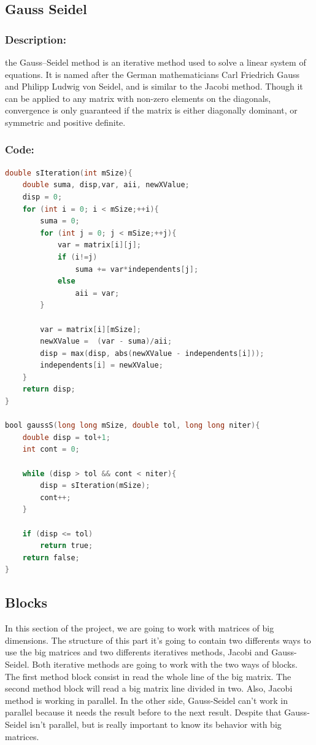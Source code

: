 \documentclass{article}
\begin{document}
\subsection{Gauss Seidel}

\subsubsection{Description:}
 the Gauss–Seidel method is an iterative method used to solve a linear system of equations. It is named after the German mathematicians Carl Friedrich Gauss and Philipp Ludwig von Seidel, and is similar to the Jacobi method. Though it can be applied to any matrix with non-zero elements on the diagonals, convergence is only guaranteed if the matrix is either diagonally dominant, or symmetric and positive definite.

\subsubsection{Code:}

\begin{lstlisting}[language=C]
  double sIteration(int mSize){
    double suma, disp,var, aii, newXValue;
    disp = 0;
    for (int i = 0; i < mSize;++i){
        suma = 0;
        for (int j = 0; j < mSize;++j){
            var = matrix[i][j];
            if (i!=j)
                suma += var*independents[j];
            else
                aii = var;
        }

        var = matrix[i][mSize];
        newXValue =  (var - suma)/aii;
        disp = max(disp, abs(newXValue - independents[i]));
        independents[i] = newXValue;
    }
    return disp;
}

bool gaussS(long long mSize, double tol, long long niter){
    double disp = tol+1;
    int cont = 0;

    while (disp > tol && cont < niter){
        disp = sIteration(mSize);
        cont++;
    }

    if (disp <= tol)
        return true;
    return false;
}

\end{lstlisting}


\subsection{Blocks}

In this section of the project, we are going to work with matrices of big dimensions. The structure of this part it's going to contain two differents ways to use the big matrices and two differents iteratives methods, Jacobi and Gauss-Seidel. Both iterative methods are going to work with the two ways of blocks. The first method block consist in read the whole line of the big matrix. The second method block will read a big matrix line divided in two. Also, Jacobi method is working in parallel. In the other side, Gauss-Seidel can't work in parallel because it needs the result before to the next result. Despite that Gauss-Seidel isn't parallel, but is really important to know its behavior with big matrices.
\end{document}
